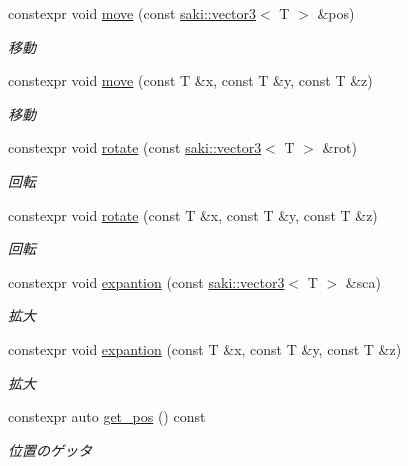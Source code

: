 \begin{DoxyCompactItemize}
\item 
constexpr void \mbox{\hyperlink{classsaki_1_1transform_a24a42ef2114b77f0e4520b693d677d60}{move}} (const \mbox{\hyperlink{classsaki_1_1vector3}{saki\+::vector3}}$<$ T $>$ \&pos)
\begin{DoxyCompactList}\small\item\em 移動 \end{DoxyCompactList}\item 
constexpr void \mbox{\hyperlink{classsaki_1_1transform_aad46d5a8b608aa9d94fd29a1fe4d5609}{move}} (const T \&x, const T \&y, const T \&z)
\begin{DoxyCompactList}\small\item\em 移動 \end{DoxyCompactList}\item 
constexpr void \mbox{\hyperlink{classsaki_1_1transform_a34a7facf52587a38a40a7ff6643568cf}{rotate}} (const \mbox{\hyperlink{classsaki_1_1vector3}{saki\+::vector3}}$<$ T $>$ \&rot)
\begin{DoxyCompactList}\small\item\em 回転 \end{DoxyCompactList}\item 
constexpr void \mbox{\hyperlink{classsaki_1_1transform_a00065f2da91bca7ac0aff6efd46ac2ae}{rotate}} (const T \&x, const T \&y, const T \&z)
\begin{DoxyCompactList}\small\item\em 回転 \end{DoxyCompactList}\item 
constexpr void \mbox{\hyperlink{classsaki_1_1transform_acb1e4cc039b689a97ed4098f566c7907}{expantion}} (const \mbox{\hyperlink{classsaki_1_1vector3}{saki\+::vector3}}$<$ T $>$ \&sca)
\begin{DoxyCompactList}\small\item\em 拡大 \end{DoxyCompactList}\item 
constexpr void \mbox{\hyperlink{classsaki_1_1transform_ab6c97d4f30cc45b1dc1d200ce7a0c483}{expantion}} (const T \&x, const T \&y, const T \&z)
\begin{DoxyCompactList}\small\item\em 拡大 \end{DoxyCompactList}\item 
constexpr auto \mbox{\hyperlink{classsaki_1_1transform_a6c1489a48121fc89bf7238327dd2a1c4}{get\+\_\+pos}} () const
\begin{DoxyCompactList}\small\item\em 位置のゲッタ \end{DoxyCompactList}\item 

\end{DoxyCompactItemize}
